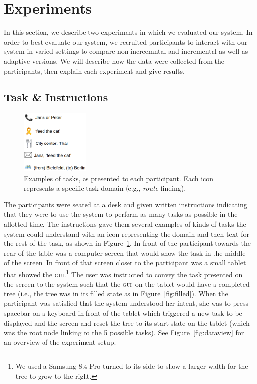 \documentclass[11pt]{article}
\newcommand{\ui}[0]{\textsc{gui}}
\begin{document}
\section{Experiments}
\label{section:experiments}

In this section, we describe two experiments in which we evaluated our system. In order to best evaluate our system, we recruited participants to interact with our system in varied settings to compare non-increemntal and incremental as well as adaptive versions. We will describe how the data were collected from the participants, then explain each experiment and give results.

\subsection{Task \& Instructions} 


\begin{figure}
  \centering
      \includegraphics[width=0.3\textwidth]{figures/taskexample.png}	
      \caption{Examples of tasks, as presented to each participant. Each icon represents a specific task domain (e.g., \emph{route} finding).\label{fig:taskex}}
\end{figure}

The participants were seated at a desk and given written instructions indicating that they were to use the system to perform as many tasks as possible in the allotted time. The instructions gave them several examples of kinds of tasks the system could understand with an icon representing the domain and then text for the rest of the task, as shown in Figure~\ref{fig:taskex}. In front of the participant towards the rear of the table was a computer screen that would show the task in the middle of the screen. In front of that screen closer to the participant was a small tablet that showed the \ui.\footnote{We used a Samsung 8.4 Pro turned to its side to show a larger width for the tree to grow to the right.} The user was instructed to convey the task presented on the screen to the system such that the \ui\ on the tablet would have a completed tree (i.e., the tree was in its filled state as in Figure~\ref{fig:filled}). When the participant was satisfied that the system understood her intent, she was to press spacebar on a keyboard in front of the tablet which triggered a new task to be displayed and the screen and reset the tree to its start state on the tablet (which was the root node linking to the 5 possible tasks). See Figure~\ref{fig:dataview} for an overview of the experiment setup.
\end{document}
